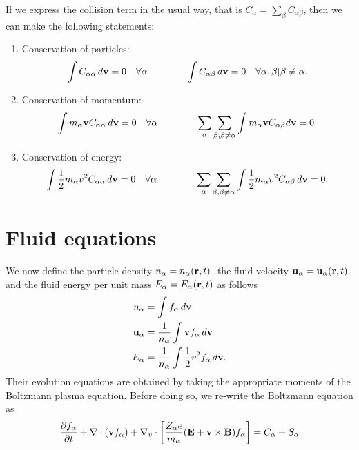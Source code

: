 \documentclass[oneside,a4paper,11pt]{report}
\begin{document}
If we express the collision term in the usual way, that is $C_\alpha = \sum_\beta C_{\alpha \beta}$, then we can make the following statements:
\begin{enumerate}
\item Conservation of particles:
\begin{equation}
\int C_{\alpha \alpha} \, d\mathbf{v} = 0 \quad \forall \alpha \qquad \qquad
\int C_{\alpha \beta} \,d\mathbf{v} = 0 \quad \forall \alpha, \beta | \beta \ne \alpha.
\end{equation}

\item Conservation of momentum:
\begin{equation}
\int m_\alpha \mathbf{v} C_{\alpha \alpha} \, d\mathbf{v} = 0 \quad \forall \alpha \qquad \qquad \sum_\alpha \sum_{\beta, \beta \ne \alpha} \int m_\alpha \mathbf{v} C_{\alpha \beta} d\mathbf{v} = 0.
\end{equation}

\item Conservation of energy:
\begin{equation}
\int \frac{1}{2} m_\alpha v^2 C_{\alpha \alpha} \, d\mathbf{v} = 0 \quad \forall \alpha \qquad \qquad \sum_\alpha \sum_{\beta, \beta \ne \alpha} \int \frac{1}{2} m_\alpha v^2 C_{\alpha \beta} \, d\mathbf{v} = 0.
\end{equation}

\end{enumerate}

\section{Fluid equations}
We now define the particle density $n_\alpha = n_\alpha(\mathbf{r},t)$, the fluid velocity $\mathbf{u}_\alpha = \mathbf{u}_\alpha(\mathbf{r},t)$ and the fluid energy per unit mass $E_\alpha = E_\alpha(\mathbf{r},t)$ as follows
\begin{align}
n_\alpha &= \int f_\alpha \, d\mathbf{v} \\
\mathbf{u}_\alpha &= \frac{1}{n_\alpha} \int \mathbf{v} f_\alpha \, d\mathbf{v} \\
E_\alpha &= \frac{1}{n_\alpha} \int \frac{1}{2} v^2 f_\alpha \, d\mathbf{v}.
\end{align}
Their evolution equations are obtained by taking the appropriate moments of the Boltzmann plasma equation. Before doing so, we re-write the Boltzmann equation as
\begin{equation}
\label{eq:boltz_mod}
\frac{\partial f_\alpha}{\partial t} + \nabla \cdot (\mathbf{v} f_\alpha) + \nabla_v \cdot \left [ \frac{Z_\alpha e}{m_\alpha} ( \mathbf{E} + \mathbf{v} \times \mathbf{B} ) f_\alpha \right ] = C_\alpha + S_\alpha
\end{equation}
\end{document}
